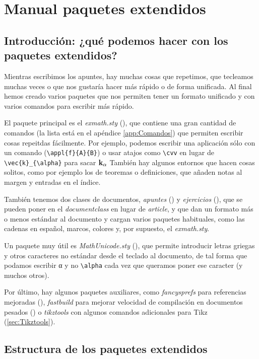 \chapter{Manual paquetes extendidos}
\label{chap:PaqueteExtendido}

\section{Introducción: ¿qué podemos hacer con los paquetes extendidos?}

Mientras escribimos los apuntes, hay muchas cosas que repetimos, que tecleamos muchas veces o que nos gustaría hacer más rápido o de forma unificada. Al final hemos creado varios paquetes que nos permiten tener un formato unificado y con varios comandos para escribir más rápido.

El paquete principal es el \textit{exmath.sty} (), que contiene una gran cantidad de comandos (la lista está en el apéndice \ref{app:Comandos}) que permiten escribir cosas repeitdas fácilmente. Por ejemplo, podemos escribir una aplicación sólo con un comando (\verb|\appl{f}{A}{B}|) o usar atajos como \verb|\cvv| en lugar de \verb|\vec{k}_{\alpha}| para sacar $\mathbf{k}_{\alpha}$ También hay algunos entornos que hacen cosas solitos, como por ejemplo los de teoremas o definiciones, que añaden notas al margen y entradas en el índice.

También tenemos dos clases de documentos, \textit{apuntes} () y \textit{ejercicios} (), que se pueden poner en el \textit{documentclass} en lugar de \textit{article}, y que dan un formato más o menos estándar al documento y cargan varios paquetes habituales, como las cadenas en español, marcos, colores y, por supuesto, el \textit{exmath.sty}.

Un paquete muy útil es \textit{MathUnicode.sty} (), que permite introducir letras griegas y otros caracteres no estándar desde el teclado al documento, de tal forma que podamos escribir α y no \verb|\alpha| cada vez que queramos poner ese caracter (y muchos otros).

Por último, hay algunos paquetes auxiliares, como \textit{fancysprefs} para referencias mejoradas (), \textit{fastbuild} para mejorar velocidad de compilación en documentos pesados () o \textit{tikztools} con algunos comandos adicionales para Tikz (\ref{sec:Tikztools}).

\section{Estructura de los paquetes extendidos}

